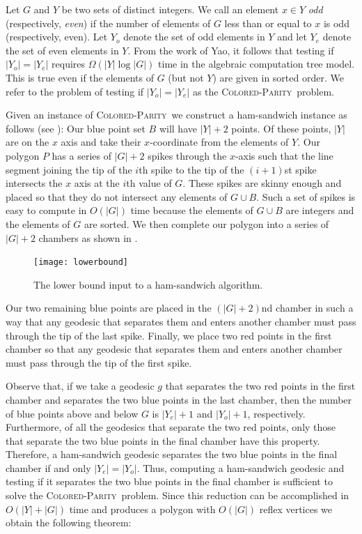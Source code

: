 \documentclass[charterfonts,lotsofwhite]{patmorin}
\newcommand{\parity}{\textsc{Colored-Parity}}
\begin{document}
Let $G$ and $Y$ be two sets of distinct integers.  We call an element
$x\in Y$ \emph{odd} (respectively, \emph{even}) if the number of
elements of $G$ less than or equal to $x$ is odd (respectively, even).
Let $Y_o$ denote the set of odd elements in $Y$ and let $Y_e$ denote
the set of even elements in $Y$.  From the work of Yao, it follows
that testing if $|Y_o|=|Y_e|$ requires $\Omega(|Y|\log |G|)$ time in
the algebraic computation tree model.  This is true even if the
elements of $G$ (but not $Y$) are given in sorted order.  We refer to
the problem of testing if $|Y_o|=|Y_e|$ as the \parity\  problem. 


Given an instance of \parity\ we construct a ham-sandwich instance as
follows (see ):  Our blue point set $B$
will have $|Y|+2$ points.  Of these points, $|Y|$ are on the $x$ axis
and take their $x$-coordinate from the elements of $Y$.  Our polygon
$P$ has a series of $|G|+2$ spikes through the $x$-axis such that the
line segment joining the tip of the $i$th spike to the tip of the
$(i+1)$st spike intersects the $x$ axis at the $i$th value of $G$.
These spikes are skinny enough and placed so that they do not
intersect any elements of $G\cup B$.  Such a set of spikes is easy to
compute in $O(|G|)$ time because the elements of $G\cup B$ are
integers and the elements of $G$ are sorted.  We then complete our
polygon into a series of $|G|+2$ chambers as shown in
.

\begin{figure}[htbp]
\begin{center}\texttt{[image: lowerbound]}\end{center}
\caption{The lower bound input to a ham-sandwich algorithm.}
\end{figure}

Our two remaining blue points are placed in the $(|G|+2)$nd chamber in
such a way that any geodesic that separates them and enters another
chamber must pass through the tip of the last spike.  Finally, we
place two red points in the first chamber so that any geodesic that
separates them and enters another chamber must pass through the tip of
the first spike.

Observe that, if we take a geodesic $g$ that separates the two red
points in the first chamber and separates the two blue points in the
last chamber, then the number of blue points above and below $G$ is
$|Y_e|+1$ and $|Y_o|+1$, respectively.  Furthermore, of all the
geodesics that separate the two red points, only those that separate
the two blue points in the final chamber have this property.
Therefore, a ham-sandwich geodesic separates the two blue points in
the final chamber if and only $|Y_e|=|Y_o|$.  Thus, computing a
ham-sandwich geodesic and testing if it separates the two blue points
in the final chamber is sufficient to solve the \parity\ problem.
Since this reduction can be accomplished in $O(|Y|+|G|)$ time and
produces a polygon with $O(|G|)$ reflex vertices we obtain the
following theorem:
\end{document}
